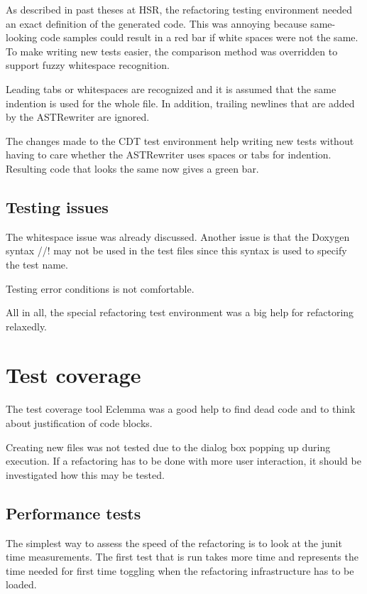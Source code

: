 As described in past theses at HSR, the refactoring testing environment
needed an exact definition of the generated code. This was annoying because
same-looking code samples could result in a red bar if white spaces were not the
same. To make writing new tests easier, the comparison method was overridden to
support fuzzy whitespace recognition.

Leading tabs or whitespaces are recognized and it is assumed that the same
indention is used for the whole file. In addition, trailing newlines that are
added by the ASTRewriter are ignored.

The changes made to the CDT test environment help writing new tests without
having to care whether the ASTRewriter uses spaces or tabs for indention.
Resulting code that looks the same now gives a green bar.

\subsection{Testing issues}

The whitespace issue was already discussed. Another issue is that the Doxygen 
syntax //! may not be used in the test files since this syntax is used to 
specify the test name.

Testing error conditions is not comfortable. %

All in all, the special refactoring test environment was a big help for 
refactoring relaxedly.

\section{Test coverage}
The test coverage tool Eclemma was a good help to find dead code and to think 
about justification of code blocks. 

Creating new files was not tested due to the dialog box popping up during 
execution. If a refactoring has to be done with more user interaction, it
should 
be investigated how this may be tested.


\subsection{Performance tests}

The simplest way to assess the speed of the refactoring is to look at the junit 
time measurements. The first test that is run takes more time and represents the 
time needed for first time toggling when the refactoring infrastructure has to 
be loaded. 

